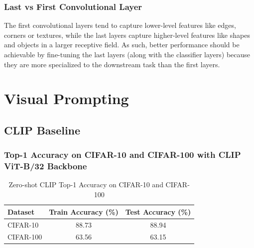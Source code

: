 \documentclass[a4paper]{article}
\begin{document}
\subsubsection{Last vs First Convolutional Layer}
The first convolutional layers tend to capture lower-level features like edges, corners or textures, while the last
layers capture higher-level features like shapes and objects in a larger receptive field. As such, better performance
should be achievable by fine-tuning the last layers (along with the classifier layers) because they are more
specialized to the downstream task than the first layers.
\bigskip

\section{Visual Prompting}
\subsection{CLIP Baseline}
\subsubsection{Top-1 Accuracy on CIFAR-10 and CIFAR-100 with CLIP ViT-B/32 Backbone}
\begin{table}[h]
    \centering
    \begin{tabular}{|l|c|c|}
    \hline
    \rowcolor{Gray}
    \textbf{Dataset} & \textbf{Train Accuracy (\%)} & \textbf{Test Accuracy (\%)} \\ \hline
    CIFAR-10 & 88.73 & 88.94 \\ \hline
    CIFAR-100 & 63.56 & 63.15 \\ \hline
    \end{tabular}
    \caption{Zero-shot CLIP Top-1 Accuracy on CIFAR-10 and CIFAR-100}
    \label{tab:clip_accuracy}
\end{table}
\end{document}
